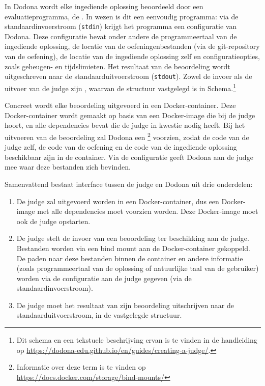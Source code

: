 In Dodona wordt elke ingediende oplossing beoordeeld door een evaluatieprogramma, de .
In wezen is dit een eenvoudig programma: via de standaardinvoerstroom (\texttt{stdin}) krijgt het programma een configuratie van Dodona.
Deze configuratie bevat onder andere de programmeertaal van de ingediende oplossing, de locatie van de oefeningenbestanden (via de git-repository van de oefening), de locatie van de ingediende oplossing zelf en configuratieopties, zoals geheugen- en tijdslimieten.
Het resultaat van de beoordeling wordt uitgeschreven naar de standaarduitvoerstroom (\texttt{stdout}).
Zowel de invoer als de uitvoer van de judge zijn , waarvan de structuur vastgelegd is in  Schema.\footnote{Dit schema en een tekstuele beschrijving ervan is te vinden in de handleiding op \url{https://dodona-edu.github.io/en/guides/creating-a-judge/}.}

Concreet wordt elke beoordeling uitgevoerd in een Docker-container.
Deze Docker-container wordt gemaakt op basis van een Docker-image die bij de judge hoort, en alle dependencies bevat die de judge in kwestie nodig heeft.
Bij het uitvoeren van de beoordeling zal Dodona een \footnote{Informatie over deze term is te vinden op \url{https://docs.docker.com/storage/bind-mounts/}} voorzien, zodat de code van de judge zelf, de code van de oefening en de code van de ingediende oplossing beschikbaar zijn in de container.
Via de configuratie geeft Dodona aan de judge mee waar deze bestanden zich bevinden.

Samenvattend bestaat interface tussen de judge en Dodona uit drie onderdelen:

\begin{enumerate}
    \item De judge zal uitgevoerd worden in een Docker-container, dus een Docker-image met alle dependencies moet voorzien worden.
    Deze Docker-image moet ook de judge opstarten.
    \item De judge stelt de invoer van een beoordeling ter beschikking aan de judge.
    Bestanden worden via een bind mount aan de Docker-container gekoppeld.
    De paden naar deze bestanden binnen de container en andere informatie (zoals programmeertaal van de oplossing of natuurlijke taal van de gebruiker) worden via de configuratie aan de judge gegeven (via de standaardinvoerstroom).
    \item De judge moet het resultaat van zijn beoordeling uitschrijven naar de standaarduitvoerstroom, in de vastgelegde structuur.
\end{enumerate}

